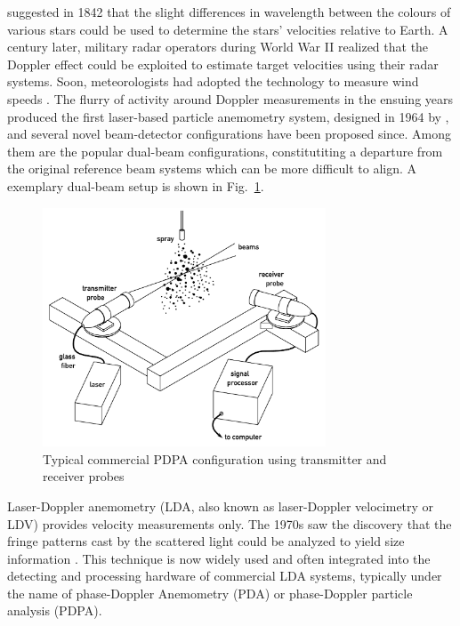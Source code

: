 \documentclass[11.5pt]{book}
\newcommand*{\figref}[1]{Fig.~\ref{#1}}
\begin{document}
\citet{Doppler42} suggested in 1842 that the slight differences in wavelength between
the colours of various stars could be used to determine the stars' velocities relative to
Earth. A century later, military radar operators during World War II realized that the Doppler
effect could be exploited to estimate target velocities using their radar
systems. Soon, meteorologists had adopted the technology to measure wind speeds
\cite{Whiton98}. The flurry of activity around Doppler measurements in the
ensuing years produced the first laser-based particle anemometry system,
designed in 1964 by \citet{Yeh64}, and several novel beam-detector
configurations have been proposed since. Among them are the popular dual-beam
configurations, constitutiting a departure from the original reference beam
systems which can be more difficult to align. A exemplary dual-beam setup is
shown in \figref{fig:pdpa-setup}.

\begin{figure}
    \centering
    \includegraphics[width=0.75\textwidth]{img/setup/pdpa_setup.pdf}
    \caption{Typical commercial PDPA configuration using transmitter and
        receiver probes \label{fig:pdpa-setup}}
\end{figure}

Laser-Doppler anemometry (LDA, also known as laser-Doppler velocimetry or LDV)
provides velocity measurements only. The 1970s saw the discovery that the fringe
patterns cast by the scattered light could be analyzed to yield size information
\cite{Durst76, Wigley78}. This technique is now widely used and often
integrated into the detecting and processing hardware of commercial LDA systems,
typically under the name of phase-Doppler Anemometry (PDA) or phase-Doppler
particle analysis (PDPA).
\end{document}
